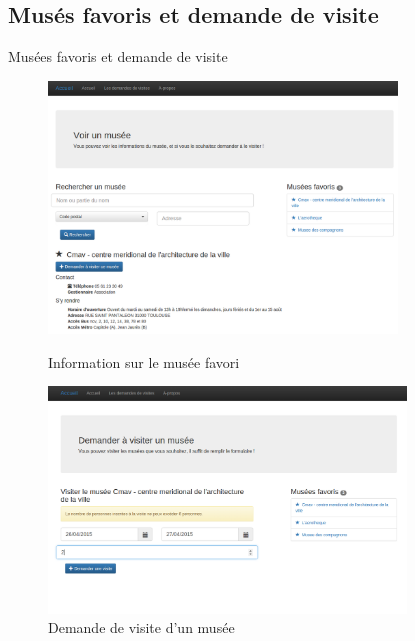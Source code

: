 \FlorentSpeak
\subsection{Mus\'es favoris et demande de visite}
\begin{frame}{Musées favoris et demande de visite}
	\begin{figure}
		\centering
		
		 { 
		\includegraphics[width=9.25cm]{screens/info_star_museum.png}
		\caption{Information sur le musée favori}
		}

		\only<3> { 
		\includegraphics[width=9.5cm]{screens/asking_visit.png}
		\caption{Demande de visite d'un musée}
		}
		

\end{figure}
\end{frame}
